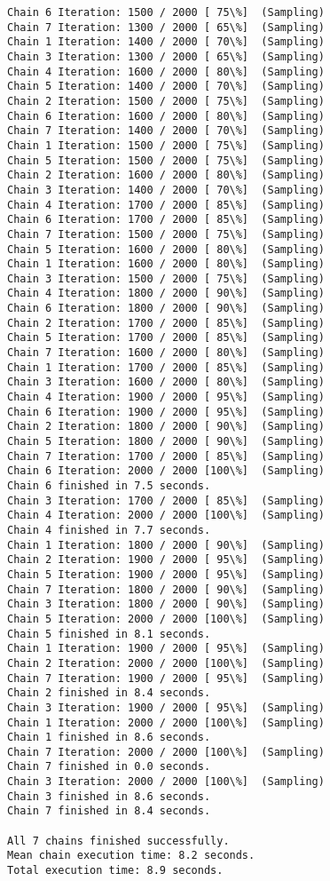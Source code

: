 \documentclass[11pt]{article}
\begin{document}
\begin{Verbatim}[commandchars=\\\{\}]
Chain 6 Iteration: 1500 / 2000 [ 75\%]  (Sampling)
Chain 7 Iteration: 1300 / 2000 [ 65\%]  (Sampling)
Chain 1 Iteration: 1400 / 2000 [ 70\%]  (Sampling)
Chain 3 Iteration: 1300 / 2000 [ 65\%]  (Sampling)
Chain 4 Iteration: 1600 / 2000 [ 80\%]  (Sampling)
Chain 5 Iteration: 1400 / 2000 [ 70\%]  (Sampling)
Chain 2 Iteration: 1500 / 2000 [ 75\%]  (Sampling)
Chain 6 Iteration: 1600 / 2000 [ 80\%]  (Sampling)
Chain 7 Iteration: 1400 / 2000 [ 70\%]  (Sampling)
Chain 1 Iteration: 1500 / 2000 [ 75\%]  (Sampling)
Chain 5 Iteration: 1500 / 2000 [ 75\%]  (Sampling)
Chain 2 Iteration: 1600 / 2000 [ 80\%]  (Sampling)
Chain 3 Iteration: 1400 / 2000 [ 70\%]  (Sampling)
Chain 4 Iteration: 1700 / 2000 [ 85\%]  (Sampling)
Chain 6 Iteration: 1700 / 2000 [ 85\%]  (Sampling)
Chain 7 Iteration: 1500 / 2000 [ 75\%]  (Sampling)
Chain 5 Iteration: 1600 / 2000 [ 80\%]  (Sampling)
Chain 1 Iteration: 1600 / 2000 [ 80\%]  (Sampling)
Chain 3 Iteration: 1500 / 2000 [ 75\%]  (Sampling)
Chain 4 Iteration: 1800 / 2000 [ 90\%]  (Sampling)
Chain 6 Iteration: 1800 / 2000 [ 90\%]  (Sampling)
Chain 2 Iteration: 1700 / 2000 [ 85\%]  (Sampling)
Chain 5 Iteration: 1700 / 2000 [ 85\%]  (Sampling)
Chain 7 Iteration: 1600 / 2000 [ 80\%]  (Sampling)
Chain 1 Iteration: 1700 / 2000 [ 85\%]  (Sampling)
Chain 3 Iteration: 1600 / 2000 [ 80\%]  (Sampling)
Chain 4 Iteration: 1900 / 2000 [ 95\%]  (Sampling)
Chain 6 Iteration: 1900 / 2000 [ 95\%]  (Sampling)
Chain 2 Iteration: 1800 / 2000 [ 90\%]  (Sampling)
Chain 5 Iteration: 1800 / 2000 [ 90\%]  (Sampling)
Chain 7 Iteration: 1700 / 2000 [ 85\%]  (Sampling)
Chain 6 Iteration: 2000 / 2000 [100\%]  (Sampling)
Chain 6 finished in 7.5 seconds.
Chain 3 Iteration: 1700 / 2000 [ 85\%]  (Sampling)
Chain 4 Iteration: 2000 / 2000 [100\%]  (Sampling)
Chain 4 finished in 7.7 seconds.
Chain 1 Iteration: 1800 / 2000 [ 90\%]  (Sampling)
Chain 2 Iteration: 1900 / 2000 [ 95\%]  (Sampling)
Chain 5 Iteration: 1900 / 2000 [ 95\%]  (Sampling)
Chain 7 Iteration: 1800 / 2000 [ 90\%]  (Sampling)
Chain 3 Iteration: 1800 / 2000 [ 90\%]  (Sampling)
Chain 5 Iteration: 2000 / 2000 [100\%]  (Sampling)
Chain 5 finished in 8.1 seconds.
Chain 1 Iteration: 1900 / 2000 [ 95\%]  (Sampling)
Chain 2 Iteration: 2000 / 2000 [100\%]  (Sampling)
Chain 7 Iteration: 1900 / 2000 [ 95\%]  (Sampling)
Chain 2 finished in 8.4 seconds.
Chain 3 Iteration: 1900 / 2000 [ 95\%]  (Sampling)
Chain 1 Iteration: 2000 / 2000 [100\%]  (Sampling)
Chain 1 finished in 8.6 seconds.
Chain 7 Iteration: 2000 / 2000 [100\%]  (Sampling)
Chain 7 finished in 0.0 seconds.
Chain 3 Iteration: 2000 / 2000 [100\%]  (Sampling)
Chain 3 finished in 8.6 seconds.
Chain 7 finished in 8.4 seconds.

All 7 chains finished successfully.
Mean chain execution time: 8.2 seconds.
Total execution time: 8.9 seconds.

    \end{Verbatim}
\end{document}
